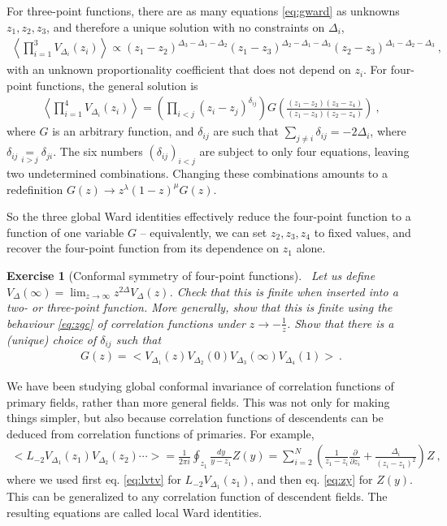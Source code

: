 \documentclass[12pt, a4paper]{article}
\theoremstyle{break}
\newtheorem{exo}{Exercise}[section]
\begin{document}
For three-point functions, there are as many equations \eqref{eq:gward} as unknowns $z_1,z_2,z_3$, and therefore a unique solution with no constraints on $\Delta_i$,
\begin{align}
 \left< \prod_{i=1}^3 V_{\Delta_i}(z_i) \right> \propto (z_1-z_2)^{\Delta_3-\Delta_1-\Delta_2} (z_1-z_3)^{\Delta_2-\Delta_1-\Delta_3} (z_2-z_3)^{\Delta_1-\Delta_2-\Delta_3}\ ,
 \label{eq:3pt}
\end{align}
with an unknown proportionality coefficient that does not depend on $z_i$.
For four-point functions, the general solution is
\begin{align}
 \left< \prod_{i=1}^4 V_{\Delta_i}(z_i) \right> = \left(\prod_{i<j}(z_i-z_j)^{\delta_{ij}}\right) G\left(\frac{(z_1-z_2)(z_3-z_4)}{(z_1-z_3)(z_2-z_4)}\right)\ ,
 \label{eq:4pt}
\end{align}
where $G$ is an arbitrary function, and $\delta_{ij}$ are such that $\sum_{j\neq i} \delta_{ij} = -2\Delta_i$, where $\delta_{ij}\underset{i>j}{=}\delta_{ji}$. The six numbers $(\delta_{ij})_{i<j}$ are subject to only four equations, leaving two undetermined combinations. Changing these combinations amounts to a redefinition $G(z)\to z^\lambda (1-z)^\mu G(z)$.

So the three global Ward identities effectively reduce the four-point function to a function of one variable $G$ -- equivalently, we can set $z_2,z_3,z_4$ to fixed values, and recover the four-point function from its dependence on $z_1$ alone. 

\begin{exo}[Conformal symmetry of four-point functions]
~\label{exo:4pt}
 Let us define $V_\Delta(\infty) = \lim_{z\to\infty} z^{2\Delta}V_\Delta(z) $. Check that this is finite when inserted into a two- or three-point function. More generally, show that this is finite using the behaviour \eqref{eq:zgc} of correlation functions under $z\to -\frac{1}{z}$. 
 Show that there is a (unique) choice of $\delta_{ij}$ such that 
 \begin{align}
  G(z) = \Big< V_{\Delta_1}(z) V_{\Delta_2}(0)V_{\Delta_3}(\infty)V_{\Delta_4}(1) \Big>\ .
 \end{align}
\end{exo}

We have been studying global conformal invariance of correlation functions of primary fields, rather than more general fields. This was not only for making things simpler, but also because correlation functions of descendents can be deduced from correlation functions of primaries. For example,
\begin{align}
 \Big< L_{-2}V_{\Delta_1}(z_1) V_{\Delta_2}(z_2)\cdots \Big>
  = \frac{1}{2\pi i}\oint_{z_1} \frac{dy}{y-z_1} Z(y)
  =\sum_{i=2}^N\left(\frac{1}{z_1-z_i}\frac{\partial}{\partial z_i} +\frac{\Delta_i}{(z_i-z_1)^2}\right) Z\ ,
  \label{eq:ltv}
\end{align}
where we used first eq. \eqref{eq:lvtv} for $L_{-2}V_{\Delta_1}(z_1)$, and then eq. \eqref{eq:zy} for $Z(y)$.
This can be generalized to any correlation function of descendent fields. The resulting equations are called local Ward identities.
\end{document}
